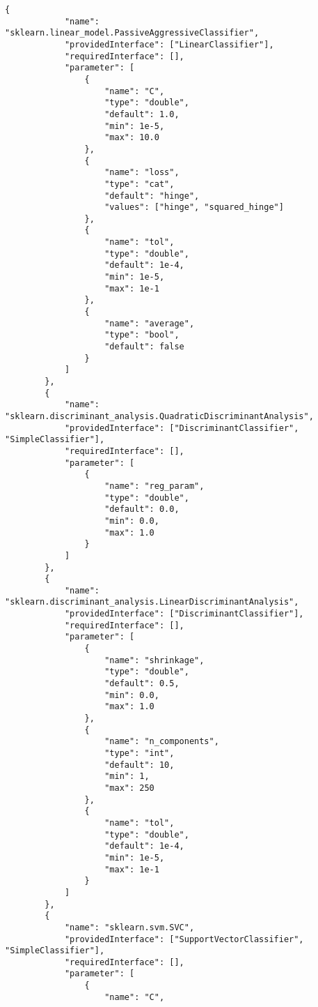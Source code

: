 \begin{Verbatim}[fontsize=\scriptsize]
        {
            "name": "sklearn.linear_model.PassiveAggressiveClassifier",
            "providedInterface": ["LinearClassifier"],
            "requiredInterface": [],
            "parameter": [
                {
                    "name": "C",
                    "type": "double",
                    "default": 1.0,
                    "min": 1e-5,
                    "max": 10.0
                },
                {
                    "name": "loss",
                    "type": "cat",
                    "default": "hinge",
                    "values": ["hinge", "squared_hinge"]
                },
                {
                    "name": "tol",
                    "type": "double",
                    "default": 1e-4,
                    "min": 1e-5,
                    "max": 1e-1
                },
                {
                    "name": "average",
                    "type": "bool",
                    "default": false
                }
            ]
        },
        {
            "name": "sklearn.discriminant_analysis.QuadraticDiscriminantAnalysis",
            "providedInterface": ["DiscriminantClassifier", "SimpleClassifier"],
            "requiredInterface": [],
            "parameter": [
                {
                    "name": "reg_param",
                    "type": "double",
                    "default": 0.0,
                    "min": 0.0,
                    "max": 1.0
                }
            ]
        },
        {
            "name": "sklearn.discriminant_analysis.LinearDiscriminantAnalysis",
            "providedInterface": ["DiscriminantClassifier"],
            "requiredInterface": [],
            "parameter": [
                {
                    "name": "shrinkage",
                    "type": "double",
                    "default": 0.5,
                    "min": 0.0,
                    "max": 1.0
                },
                {
                    "name": "n_components",
                    "type": "int",
                    "default": 10,
                    "min": 1,
                    "max": 250
                },
                {
                    "name": "tol",
                    "type": "double",
                    "default": 1e-4,
                    "min": 1e-5,
                    "max": 1e-1
                }
            ]
        },
        {
            "name": "sklearn.svm.SVC",
            "providedInterface": ["SupportVectorClassifier", "SimpleClassifier"],
            "requiredInterface": [],
            "parameter": [
                {
                    "name": "C",

\end{Verbatim}
